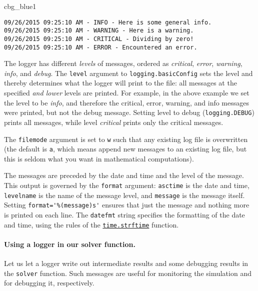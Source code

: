 \documentclass[graybox,sectrefs,envcountresetchap,open=right,final]{svmonodo}
\newenvironment{_cod_tight}[1]{
   \def\FrameCommand{\colorbox{#1}}
   \FrameRule0.6pt\MakeFramed {\FrameRestore}\vskip3mm}
   {\vskip0mm\endMakeFramed}
\newenvironment{cod}[1]{
\bgroup\rmfamily
\fboxsep=0mm\relax
\begin{_cod_tight}{#1}
\list{}{\parsep=-2mm\parskip=0mm\topsep=0pt\leftmargin=2mm
\rightmargin=2\leftmargin\leftmargin=4pt\relax}
\item\relax}
{\endlist\end{_cod_tight}\egroup}
\begin{document}
\begin{cod}{cbg_blue1}\begin{Verbatim}[numbers=none,fontsize=\fontsize{9pt}{9pt},baselinestretch=0.95,xleftmargin=2mm]
09/26/2015 09:25:10 AM - INFO - Here is some general info.
09/26/2015 09:25:10 AM - WARNING - Here is a warning.
09/26/2015 09:25:10 AM - CRITICAL - Dividing by zero!
09/26/2015 09:25:10 AM - ERROR - Encountered an error.
\end{Verbatim}
\end{cod}
\noindent
The logger has different \emph{levels} of messages, ordered as
\emph{critical}, \emph{error}, \emph{warning}, \emph{info}, and \emph{debug}.
The \texttt{level} argument to \texttt{logging.basicConfig} sets the level
and thereby determines what the logger will print to the file:
all messages at the specified \emph{and lower} levels are printed.
For example, in the above example we set the level to be
\emph{info}, and therefore the critical, error, warning, and info
messages were printed, but not the debug message.
Setting level to debug (\texttt{logging.DEBUG}) prints all messages,
while level \emph{critical} prints only the critical messages.

The \texttt{filemode} argument is set to \texttt{w} such that any existing
log file is overwritten (the default is \texttt{a}, which means append
new messages to an existing log file, but this is seldom what
you want in mathematical computations).

The messages are preceded by the date and time and the level of
the message. This output is governed by the \texttt{format} argument:
\texttt{asctime} is the date and time, \texttt{levelname} is the name of
the message level, and \texttt{message} is the message itself.
Setting \Verb!format='%
nothing more is printed on each line. The \texttt{datefmt} string
specifies the formatting of the date and time, using the
rules of the \href{{https://docs.python.org/2/library/time.html#time.strftime}}{\nolinkurl{time.strftime}} function.

\paragraph{Using a logger in our solver function.}
Let us let a logger write out intermediate results and some debugging
results in the \texttt{solver} function. Such messages are useful for
monitoring the simulation and for debugging it, respectively.
\end{document}
